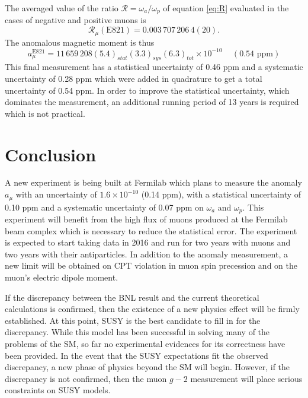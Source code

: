 \documentclass{outhesis}
\begin{document}
The averaged value of the ratio $\mathcal{R} = \omega_a/\omega_p$ of equation \ref{eq:R} evaluated in the cases of negative and positive muons is
\begin{equation}
\mathcal{R}_{\mu}\left(\text{E821}\right) = 0.003\,707\,206\,4(20).
\end{equation}
The anomalous magnetic moment is thus 
\begin{equation}
a_{\mu}^{\text{E821}} = 11\, 659\, 208  \left(5.4\right)_{stat}  \left(3.3\right)_{sys}  \left(6.3\right)_{tot} \times 10^{-10} \,\,\,\,\,\,\, \left(0.54  \text{ ppm}\right)
\end{equation}
This final measurement has a statistical uncertainty of 0.46 ppm and a systematic uncertainty of 0.28 ppm which were added in quadrature to get a total uncertainty of 0.54 ppm. In order to improve the statistical uncertainty, which dominates the measurement, an additional running period of 13 years is required which is not practical.

\section{Conclusion}

A new experiment is being built at Fermilab which plans to measure the anomaly $a_{\mu}$ with an uncertainty of $1.6 \times 10^{-10}$ (0.14 ppm),  with a statistical uncertainty of 0.10 ppm and a systematic uncertainty of 0.07 ppm on $\omega_a$ and $\omega_p$. This experiment will benefit from the high flux of muons produced at the Fermilab beam complex which is necessary to reduce the statistical error. The experiment is expected to start taking data in 2016 and run for two years with muons and two years with their antiparticles. In addition to the anomaly measurement, a new limit will be obtained on CPT violation in muon spin precession and on the muon's electric dipole moment. 

If the discrepancy between the BNL result and the current theoretical calculations is confirmed, then the existence of a new physics effect will be  firmly established. At this point, SUSY is the best candidate to fill in for the discrepancy. While this model has been successful in solving many of the problems of the SM, so far no experimental evidences for its correctness have been provided. In the event that the SUSY expectations fit the observed discrepancy, a new phase of physics beyond the SM will begin. However, if the discrepancy is not confirmed, then the muon $g-2$ measurement will place serious constraints on SUSY models.




\end{document}
